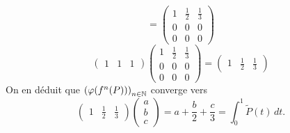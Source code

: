 \begin{enumerate}
\begin{displaymath}
=
\begin{pmatrix}
 1 & \frac{1}{2} & \frac{1}{3}\\ 0 & 0 & 0 \\ 0 & 0 & 0 
\end{pmatrix} 
\end{displaymath}
\begin{displaymath}
\begin{pmatrix}
 1 & 1 & 1
\end{pmatrix}
\begin{pmatrix}
 1 & \frac{1}{2} & \frac{1}{3}\\ 0 & 0 & 0 \\ 0 & 0 & 0 
\end{pmatrix} 
=
\begin{pmatrix}
 1 & \frac{1}{2} & \frac{1}{3} 
\end{pmatrix} 
\end{displaymath}
On en déduit que $\left( \varphi(f^n(P))\right)_{n\in \mathbb{N}}$ converge vers
\begin{displaymath}
\begin{pmatrix}
 1 & \frac{1}{2} & \frac{1}{3} 
\end{pmatrix} 
\begin{pmatrix}
 a \\ b \\ c
\end{pmatrix}
= a + \frac{b}{2} + \frac{c}{3}
= \int_0^1 \widetilde{P}(t)\,dt.
\end{displaymath}
\end{enumerate}

